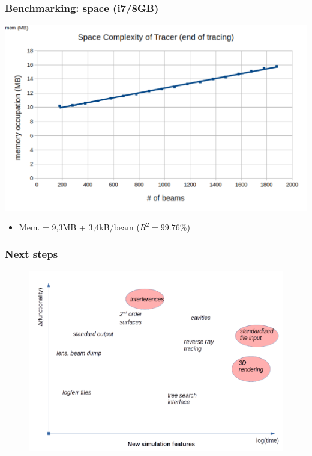 \documentclass{beamer}
\begin{document}
\begin{frame}
\frametitle{Benchmarking: space (i7/8GB)}

\begin{center}
\includegraphics[scale = .45]{spacecomplexity.pdf}
\end{center}


\begin{itemize}
\item Mem. = 9,3MB + 3,4kB/beam ($R^2 = 99.76$\%)
\end{itemize}
\end{frame}

\begin{frame}
\frametitle{Next steps}
\begin{figure}
\begin{center}
\includegraphics[scale=0.36]{newfeatures.pdf}

\end{center}
\end{figure}
\end{frame}
\end{document}
